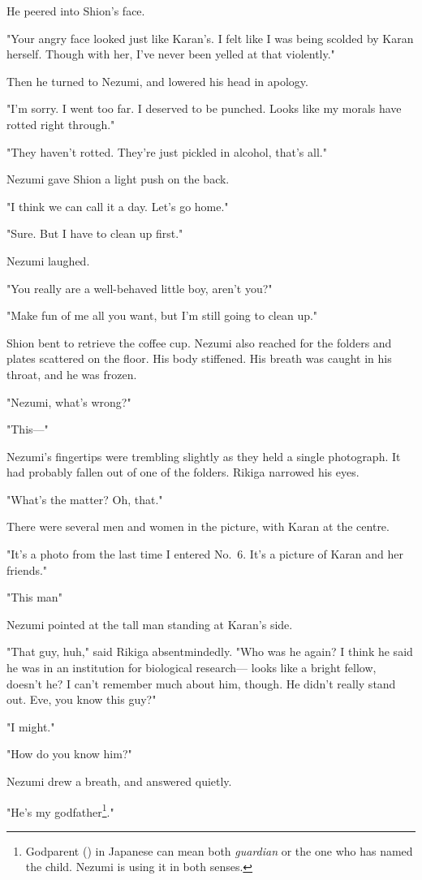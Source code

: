 He peered into Shion's face.

"Your angry face looked just like Karan's. I felt like I was being
scolded by Karan herself. Though with her, I've never been yelled at
that violently."

Then he turned to Nezumi, and lowered his head in apology.

"I'm sorry. I went too far. I deserved to be punched. Looks like my
morals have rotted right through."

"They haven't rotted. They're just pickled in alcohol, that's all."

Nezumi gave Shion a light push on the back.

"I think we can call it a day. Let's go home."

"Sure. But I have to clean up first."

Nezumi laughed.

"You really are a well-behaved little boy, aren't you?"

"Make fun of me all you want, but I'm still going to clean up."

Shion bent to retrieve the coffee cup. Nezumi also reached for the
folders and plates scattered on the floor. His body stiffened. His
breath was caught in his throat, and he was frozen.

"Nezumi, what's wrong?"

"This---"

Nezumi's fingertips were trembling slightly as they held a single
photograph. It had probably fallen out of one of the folders. Rikiga
narrowed his eyes.

"What's the matter? Oh, that."

There were several men and women in the picture, with Karan at the
centre.

"It's a photo from the last time I entered No.~6. It's a picture of
Karan and her friends."

"This man\el "

Nezumi pointed at the tall man standing at Karan's side.

"That guy, huh," said Rikiga absentmindedly. "Who was he again? I think
he said he was in an institution for biological research--- looks like a
bright fellow, doesn't he? I can't remember much about him, though. He
didn't really stand out. Eve, you know this guy?"

"I might."

"How do you know him?"

Nezumi drew a breath, and answered quietly.

"He's my godfather\footnote{Godparent () in Japanese can mean both \emph{guardian} or the one who has named the child. Nezumi is using it in both senses.}."